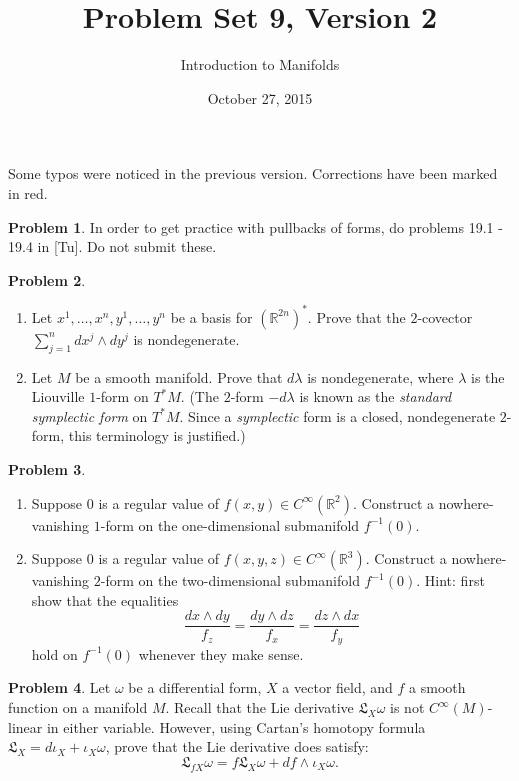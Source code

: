 \documentclass{amsart}
\newcommand{\+}[1]{\ensuremath{\mathbf{#1}}}
\newcommand{\R}{{\mathbb R}}
\theoremstyle{definition}
\newtheorem{prob}{Problem}
\begin{document}
\title{Problem Set 9, Version 2}
\date{October 27, 2015}
\author{Introduction to Manifolds}

\maketitle
Some typos were noticed in the previous version.  Corrections have been marked in red.
\begin{prob}
In order to get practice with pullbacks of forms,
do problems 19.1 - 19.4 in [Tu].  Do not submit these. 
\end{prob}

\begin{prob}
\begin{enumerate}
 \item Let $x^1, \ldots, x^n, y^1,
\ldots, y^n$ be a basis for $(\R^{2n})^*$.  Prove that the $2$-covector  $\sum^n_{j=1} dx^j \wedge dy^j$ is nondegenerate.
 \item Let $M$ be a smooth manifold.  Prove that $d\lambda$ is nondegenerate, where $\lambda$ is the Liouville $1$-form on $T^*M$.  (The $2$-form $-d\lambda$ is known as the 
 \emph{standard symplectic form} on $T^*M$.  Since
 a \emph{symplectic} form is a closed, nondegenerate
 $2$-form, this terminology is justified.)
\end{enumerate}
\end{prob}


\begin{prob}
\begin{enumerate}
 \item Suppose $0$ is a regular value of 
 $f(x,y) \in C^{\infty}(\R^2)$.
 Construct a nowhere-vanishing $1$-form
 on the one-dimensional submanifold $f^{-1}(0)$.
 \item Suppose $0$ is a regular value of 
 $f(x,y,z) \in C^{\infty}(\R^3)$.
 Construct a nowhere-vanishing {\color{red}$2$-form}
 on the two-dimensional submanifold $f^{-1}(0)$.
 Hint: first show that the equalities
 \[
 \frac{dx \wedge dy}{f_z} = \frac{dy \wedge dz}{f_x} = \frac{dz \wedge dx}{f_y}
 \]
 hold on $f^{-1}(0)$ whenever they make sense.
\end{enumerate}
\end{prob}

\begin{prob}
Let $\omega$ be a differential form, $X$ a vector field,
and $f$ a smooth function on a manifold $M$.
Recall that the Lie derivative $\mathfrak{L}_X\omega$ is
not $C^{\infty}(M)$-linear in either variable.
However, using Cartan's homotopy formula $\mathfrak{L}_X = d\iota_X + \iota_X\omega$,
prove that the Lie derivative does satisfy:
\[
\mathfrak{L}_{fX}\omega = f\mathfrak{L}_X\omega + df \wedge \iota_X\omega.
\]
\end{prob}
\end{document}
